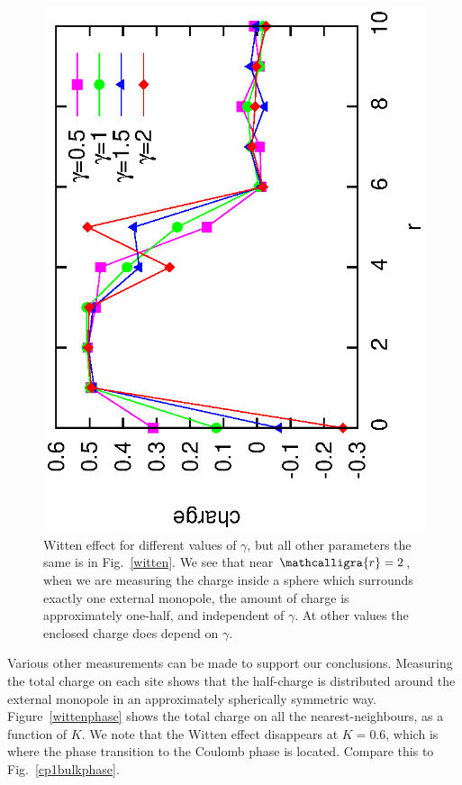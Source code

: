 \documentclass[prb,twocolumn]{revtex4-1}
\newcommand{\scripty}[1]{\ensuremath{\mathcalligra{#1}}}
\begin{document}
\begin{figure}
\includegraphics[angle=-90,width=0.9\linewidth]{figures/diffgamma.eps}
\caption{Witten effect for different values of $\gamma$, but all other parameters the same is in Fig.~\ref{witten}. We see that near $\scripty{r}=2$, when we are measuring the charge inside a sphere which surrounds exactly one external monopole, the amount of charge is approximately one-half, and independent of $\gamma$. At other values the enclosed charge does depend on $\gamma$.}
\label{diffgamma}
\end{figure}

Various other measurements can be made to support our conclusions. Measuring the total charge on each site shows that the half-charge is distributed around the external monopole in an approximately spherically symmetric way. Figure~\ref{wittenphase} shows the total charge on all the nearest-neighbours, as a function of $K$. We note that the Witten effect disappears at $K=0.6$, which is where the phase transition to the Coulomb phase is located. Compare this to Fig.~\ref{cp1bulkphase}.
\end{document}
